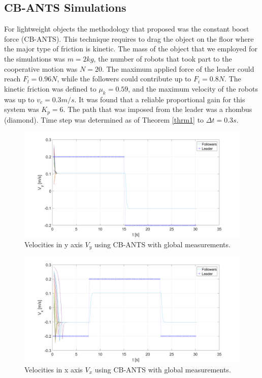 \documentclass[letterpaper, 10 pt, conference]{ieeeconf}
\begin{document}
\subsection{CB-ANTS Simulations}
For lightweight objects the methodology that proposed was the constant boost force (CB-ANTS). This technique requires to drag the object on the floor where the major type of friction is kinetic. The mass of the object that we employed for the simulations was $m=2kg$, the number of robots that took part to the cooperative motion was $N=20$. The maximum applied force of the leader could reach $F_l=0.96N$, while the followers could contribute up to $F_i=0.8N$. The kinetic friction was defined to $\mu_k=0.59$, and the maximum velocity of the robots was up to $v_c=0.3m/s$. It was found that a reliable proportional gain for this system was $K_p=6$. The path that was imposed from the leader was a rhombus (diamond). Time step was determined as of Theorem \ref{thrm1} to $\Delta t =0.3s$.
\begin{figure}[!h]
	\includegraphics[width=.53\textwidth]{figures/CB_ANTS_Vy.png}
	\centering
	\caption{Velocities in y axis  $V_y$ using CB-ANTS with global measurements.}
	\label{fcbvy}
\end{figure}
\begin{figure}[!h]
	\includegraphics[width=.53\textwidth]{figures/CB_ANTS_Vx.png}
	\centering
	\caption{Velocities in x axis  $V_x$ using CB-ANTS with global measurements.}
	\label{fcbvx}
\end{figure}
\end{document}
